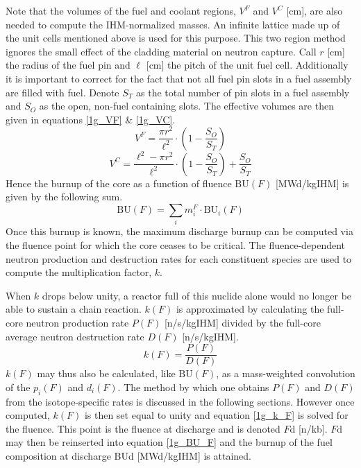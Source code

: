 Note that the volumes of the fuel and coolant regions, $V^F$ and $V^C$ [cm], are also needed to 
compute the IHM-normalized masses.  An infinite lattice made up of the unit cells mentioned 
above is used for this purpose.  This two region method ignores the small 
effect of the cladding material on neutron capture.  Call $r$ [cm] the radius of the fuel pin and $\ell$ [cm] 
the pitch of the unit fuel cell.  Additionally it is important to correct for the fact that not all fuel 
pin slots in a fuel assembly are filled with fuel.  Denote $S_T$ as the total number of pin 
slots in a fuel assembly and $S_O$ as the open, non-fuel containing slots.  The effective volumes 
are then given in equations \ref{1g_VF} \& \ref{1g_VC}.
\begin{equation}
\label{1g_VF}
V^F = \frac{\pi r^2}{\ell^2} \cdot \left(1 - \frac{S_O}{S_T}\right)
\end{equation}
\begin{equation}
\label{1g_VC}
V^C = \frac{\ell^2 - \pi r^2}{\ell^2} \cdot \left(1 - \frac{S_O}{S_T}\right) + \frac{S_O}{S_T}
\end{equation}
Hence the burnup of the core as a function of fluence $\mbox{BU}(F)$ [MWd/kgIHM] is given by 
the following sum.
\begin{equation}
\label{1g_BU_F}
\mbox{BU}(F) = \sum_i m_i^F \cdot \mbox{BU}_i(F)
\end{equation}
Once this burnup is known, the maximum discharge burnup can be computed via the fluence point 
for which the core ceases to be critical.  The fluence-dependent neutron production and destruction 
rates for each constituent species are used to compute the multiplication factor, $k$.    

When $k$ drops 
below unity, a reactor full of this nuclide alone would no longer be able to sustain a chain reaction.  $k(F)$ is 
approximated by calculating the full-core neutron production rate $P(F)$ [n/s/kgIHM] divided by the 
full-core average neutron destruction rate $D(F)$ [n/s/kgIHM].  
\begin{equation}
\label{1g_k_F}
k(F) = \frac{P(F)}{D(F)}
\end{equation}
$k(F)$ may thus also be calculated, like $\mbox{BU}(F)$, as a mass-weighted convolution of the $p_i(F)$ and 
$d_i(F)$.  The method by which one obtains $P(F)$ and $D(F)$ from the isotope-specific rates is discussed 
in the following sections.  However once computed, $k(F)$ is then set equal to unity and equation \ref{1g_k_F} 
is solved for the fluence.  This point is the fluence at discharge and is denoted $F\mbox{d}$ [n/kb].  
$F\mbox{d}$ may then be reinserted into equation \ref{1g_BU_F} and the burnup of the fuel composition at discharge 
BUd [MWd/kgIHM] is attained.

